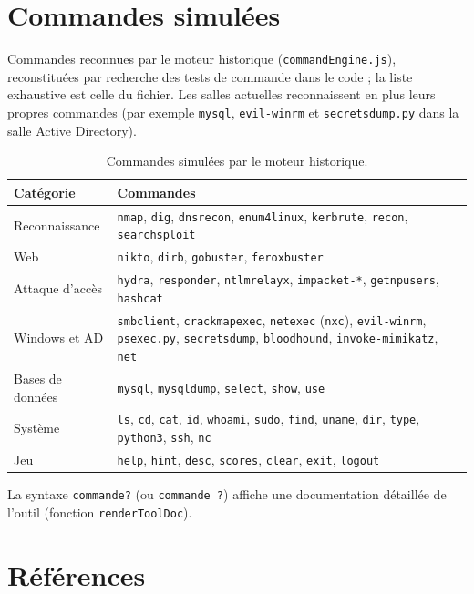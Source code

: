 \documentclass[11pt,a4paper]{report}
\newcommand{\file}[1]{\texttt{\nolinkurl{#1}}}
\begin{document}
\chapter{Commandes simul\'ees}

Commandes reconnues par le moteur historique (\file{commandEngine.js}), reconstitu\'ees
par recherche des tests de commande dans le code ; la liste exhaustive est celle du
fichier. Les salles actuelles reconnaissent en plus leurs propres commandes
(par exemple \texttt{mysql}, \texttt{evil-winrm} et \texttt{secretsdump.py} dans la
salle Active Directory).

\begin{table}[H]
\centering
\small
\begin{tabularx}{\textwidth}{@{}p{3.2cm}X@{}}
\toprule
\textbf{Cat\'egorie} & \textbf{Commandes} \\
\midrule
Reconnaissance & \texttt{nmap}, \texttt{dig}, \texttt{dnsrecon}, \texttt{enum4linux}, \texttt{kerbrute}, \texttt{recon}, \texttt{searchsploit} \\
Web & \texttt{nikto}, \texttt{dirb}, \texttt{gobuster}, \texttt{feroxbuster} \\
Attaque d'acc\`es & \texttt{hydra}, \texttt{responder}, \texttt{ntlmrelayx}, \texttt{impacket-*}, \texttt{getnpusers}, \texttt{hashcat} \\
Windows et AD & \texttt{smbclient}, \texttt{crackmapexec}, \texttt{netexec} (\texttt{nxc}), \texttt{evil-winrm}, \texttt{psexec.py}, \texttt{secretsdump}, \texttt{bloodhound}, \texttt{invoke-mimikatz}, \texttt{net} \\
Bases de donn\'ees & \texttt{mysql}, \texttt{mysqldump}, \texttt{select}, \texttt{show}, \texttt{use} \\
Syst\`eme & \texttt{ls}, \texttt{cd}, \texttt{cat}, \texttt{id}, \texttt{whoami}, \texttt{sudo}, \texttt{find}, \texttt{uname}, \texttt{dir}, \texttt{type}, \texttt{python3}, \texttt{ssh}, \texttt{nc} \\
Jeu & \texttt{help}, \texttt{hint}, \texttt{desc}, \texttt{scores}, \texttt{clear}, \texttt{exit}, \texttt{logout} \\
\bottomrule
\end{tabularx}
\caption{Commandes simul\'ees par le moteur historique.}
\end{table}

La syntaxe \texttt{commande?} (ou \texttt{commande ?}) affiche une documentation
d\'etaill\'ee de l'outil (fonction \texttt{renderToolDoc}).

\chapter{R\'ef\'erences}
\end{document}
